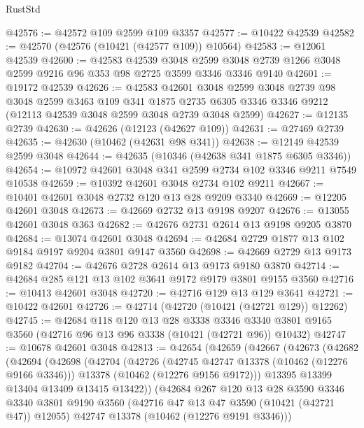 \begin{lexlean}{RustStd}
\begin{coremodule}
@42576 := @42572 @109 @2599 @109 @3357
@42577 := @10422 @42539
@42582 := @42570 (@42576 (@10421 (@42577 @109)) @10564)
@42583 := @12061 @42539
@42600 := @42583
    @42539
    @3048
    @2599
    @3048
    @2739
    @1266
    @3048
    @2599
    @9216
    @96
    @353
    @98
    @2725
    @3599
    @3346
    @3346
    @9140
@42601 := @19172 @42539
@42626 := @42583
    @42601
    @3048
    @2599
    @3048
    @2739
    @98
    @3048
    @2599
    @3463
    @109
    @341
    @1875
    @2735
    @6305
    @3346
    @3346
    @9212
    (@12113 @42539 @3048 @2599 @3048 @2739 @3048 @2599)
@42627 := @12135 @2739
@42630 := @42626 (@12123 (@42627 @109))
@42631 := @27469 @2739
@42635 := @42630 (@10462 (@42631 @98 @341))
@42638 := @12149 @42539 @2599 @3048
@42644 := @42635 (@10346 (@42638 @341 @1875 @6305 @3346))
@42654 := @10972 @42601 @3048 @341 @2599 @2734 @102 @3346 @9211 @7549 @10538
@42659 := @10392 @42601 @3048 @2734 @102 @9211
@42667 := @10401 @42601 @3048 @2732 @120 @13 @28 @9209 @3340
@42669 := @12205 @42601 @3048
@42673 := @42669 @2732 @13 @9198 @9207
@42676 := @13055 @42601 @3048 @363
@42682 := @42676 @2731 @2614 @13 @9198 @9205 @3870
@42684 := @13074 @42601 @3048
@42694 := @42684 @2729 @1877 @13 @102 @9184 @9197 @9204 @3801 @9147 @3560
@42698 := @42669 @2729 @13 @9173 @9182
@42704 := @42676 @2728 @2614 @13 @9173 @9180 @3870
@42714 := @42684 @285 @121 @13 @102 @3641 @9172 @9179 @3801 @9155 @3560
@42716 := @10413 @42601 @3048
@42720 := @42716 @129 @13 @129 @3641
@42721 := @10422 @42601
@42726 := @42714 (@42720 (@10421 (@42721 @129)) @12262)
@42745 := @42684
    @118
    @120
    @13
    @28
    @3338
    @3346
    @3340
    @3801
    @9165
    @3560
    (@42716 @96 @13 @96 @3338 (@10421 (@42721 @96)) @10432)
@42747 := @10678 @42601 @3048
@42813 := @42654
    (@42659
      (@42667
        (@42673
          (@42682
            (@42694
              (@42698
                (@42704
                  (@42726
                    (@42745 @42747 @13378 (@10462 (@12276 @9166 @3346)))
                    @13378
                    (@10462 (@12276 @9156 @9172)))
                  @13395
                  @13399
                  @13404
                  @13409
                  @13415
                  @13422))
              (@42684
                @267
                @120
                @13
                @28
                @3590
                @3346
                @3340
                @3801
                @9190
                @3560
                (@42716 @47 @13 @47 @3590 (@10421 (@42721 @47)) @12055)
                @42747
                @13378
                (@10462 (@12276 @9191 @3346)))

\end{coremodule}
\end{lexlean}
